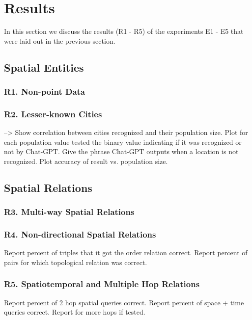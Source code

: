 \section{Results}
\label{section:results}

In this section we discuss the results (R1 - R5) of the experiments E1 - E5 that were laid out in the previous section.

\subsection{Spatial Entities} %

\subsubsection{R1. Non-point Data}


\subsubsection{R2. Lesser-known Cities}
--> Show correlation between cities recognized and their population size. Plot for each population value tested the binary value indicating if it was recognized or not by Chat-GPT.
Give the phrase Chat-GPT outputs when a location is not recognized.
Plot accuracy of result vs. population size.




\subsection{Spatial Relations} %

\subsubsection{R3. Multi-way Spatial Relations}



\subsubsection{R4. Non-directional Spatial Relations}
Report percent of triples that it got the order relation correct.
Report percent of pairs for which topological relation was correct.


\subsubsection{R5. Spatiotemporal and Multiple Hop Relations}
Report percent of 2 hop spatial queries correct.
Report percent of space + time queries correct.
Report for more hops if tested.